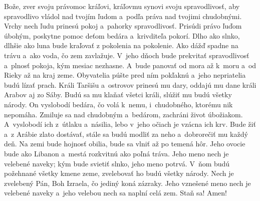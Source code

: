 Bože, zver svoju právomoc kráľovi,
kráľovmu synovi svoju spravodlivosť,
\versseparator
aby spravodlivo vládol nad tvojím ľudom
a~podľa práva nad tvojimi chudobnými.
\versseparator
Vrchy nech ľudu prinesú pokoj
a~pahorky spravodlivosť.
\versseparator
Prisúdi právo ľuďom úbohým,
poskytne pomoc deťom bedára
a~krivditeľa pokorí.
\versseparator
Dlho ako slnko, dlhšie ako luna bude kraľovať
z pokolenia na pokolenie.
\versseparator
Ako dážď spadne na trávu
a~ako voda, čo zem zavlažuje.
\versseparator
V~jeho dňoch bude prekvitať spravodlivosť a~plnosť pokoja,
kým mesiac nezhasne.
\versseparator
A~bude panovať od mora až k~moru
a~od Rieky až na kraj zeme.
\versseparator
Obyvatelia púšte pred ním pokľaknú
a~jeho nepriatelia budú lízať prach.
\versseparator
Králi Taršišu a~ostrovov prinesú mu dary,
oddajú mu dane králi Arabov aj zo Sáby.
\versseparator
Budú sa mu klaňať všetci králi,
slúžiť mu budú všetky národy.
\versseparator
On vyslobodí bedára, čo volá k~nemu,
 i~chudobného, ktorému nik nepomáha.
\versseparator
Zmiluje sa nad chudobným a~bedárom,
zachráni život úbožiakom.
\versseparator
A~vyslobodí ich z~útlaku a~násilia,
lebo v~jeho očiach je vzácna ich krv.
\versseparator
Bude žiť a~z Arábie zlato dostávať,
stále sa budú modliť za neho
a~dobrorečiť mu každý deň.
\versseparator
Na zemi bude hojnosť obilia,
bude sa vlniť až po temená hôr.
Jeho ovocie bude ako Libanon
a~mestá rozkvitnú ako poľná tráva.
\versseparator
Jeho meno nech je velebené naveky;
kým bude svietiť slnko, jeho meno potrvá.
\versseparator
V~ňom budú požehnané všetky kmene zeme,
zvelebovať ho budú všetky národy.
\versseparator
Nech je zvelebený Pán, Boh Izraela,
čo jediný koná zázraky.
\versseparator
Jeho vznešené meno nech je velebené naveky
a~jeho velebou nech sa naplní celá zem. Staň sa! Amen!